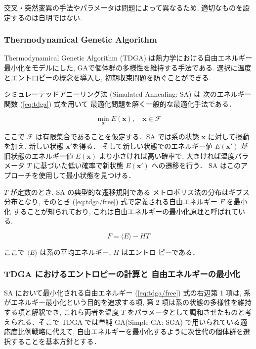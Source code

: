 交叉・突然変異の手法やパラメータは問題によって異なるため, 適切なものを設定するのは自明ではない.



\changeindent{0cm}
\subsubsection{Thermodynamical Genetic Algorithm}
\changeindent{2cm}
\label{sec:02_tdga}

Thermodynamical Genetic Algorithm (TDGA) \cite{kita1996multi} は熱力学における自由エネルギー最小化をモデルにした,
GAで個体群の多様性を維持する手法である.
選択に温度とエントロピーの概念を導入し, 初期収束問題を防ぐことができる.

シミュレーテッドアニーリング法 (Simulated Annealing: SA) は
次のエネルギー関数 (\ref{eq:tdga}) 式を用いて
最適化問題を解く一般的な最適化手法である．

\begin{equation}
  \label{eq:tdga}
  \min_{\bm{x}} E(\bm{x}), \quad
  \bm{x} \in \mathcal{F}
\end{equation}

\noindent
ここで $\mathcal{F}$ は有限集合であることを仮定する．SA
では系の状態 $\bm{x}$ に対して摂動を加え, 新しい状態 $\bm{x}'$を得る．
そして新しい状態でのエネルギー値 $E(\bm{x}')$ が
旧状態のエネルギー値 $E(\bm{x})$ より小さければ高い確率で,
大きければ温度パラメータ $T$ に基づいた低い確率で新状態 $E(\bm{x}')$ への遷移を行う．
SA はこのアプローチを使用して最小状態を見つける．


$T$ が定数のとき, SA の典型的な遷移規則である
メトロポリス法の分布はギブス分布となり, そのとき
(\ref{eq:tdga/free}) 式で定義される自由エネルギー $F$ を最小化
することが知られており, これは自由エネルギーの最小化原理と呼ばれている.

\begin{equation}
  \label{eq:tdga/free}
  F = \langle E \rangle - HT
\end{equation}

\noindent
ここで $\langle E \rangle$ は系の平均エネルギー, $H$ はエントロ
ピーである．


\subsubsection*{TDGA におけるエントロピーの計算と
自由エネルギーの最小化}


SA において最小化される自由エネルギー (\ref{eq:tdga/free}) 式の右辺第 1 項は, 系がエネルギー最小化という目的を追求する項, 第 2 項は系の状態の多様性を維持する項と解釈でき, これら両者を温度 $T$ をパラメータとして調和させたものと考えられる．そこで TDGA では単純 GA(Simple GA: SGA) で用いられている適応度比例戦略に代えて, 自由エネルギーを最小化するように次世代の個体群を選択することを基本方針とする．

